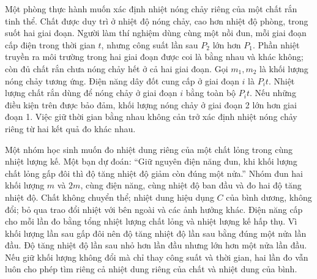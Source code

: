 
\begin{ex}
Một phòng thực hành muốn xác định nhiệt nóng chảy riêng của một chất rắn tinh thể. Chất được duy trì ở nhiệt độ nóng chảy, cao hơn nhiệt độ phòng, trong suốt hai giai đoạn. Người làm thí nghiệm dùng cùng một nồi đun, mỗi giai đoạn cấp điện trong thời gian $t$, nhưng công suất lần sau $P_2$ lớn hơn $P_1$. Phần nhiệt truyền ra môi trường trong hai giai đoạn được coi là bằng nhau và khác không; còn đủ chất rắn chưa nóng chảy hết ở cả hai giai đoạn. Gọi $m_1,m_2$ là khối lượng nóng chảy tương ứng.
\choiceTF
{\True Điện năng dây đốt cung cấp ở giai đoạn $i$ là $P_it$.}
{Nhiệt lượng chất rắn dùng để nóng chảy ở giai đoạn $i$ bằng toàn bộ $P_it$.}
{\True Nếu những điều kiện trên được bảo đảm, khối lượng nóng chảy ở giai đoạn 2 lớn hơn giai đoạn 1.}
{\True Việc giữ thời gian bằng nhau không cản trở xác định nhiệt nóng chảy riêng từ hai kết quả đo khác nhau.}
\end{ex}

\begin{ex}
Một nhóm học sinh muốn đo nhiệt dung riêng của một chất lỏng trong cùng nhiệt lượng kế. Một bạn dự đoán: ``Giữ nguyên điện năng đun, khi khối lượng chất lỏng gấp đôi thì độ tăng nhiệt độ giảm còn đúng một nửa.'' Nhóm đun hai khối lượng $m$ và $2m$, cùng điện năng, cùng nhiệt độ ban đầu và đo hai độ tăng nhiệt độ. Chất không chuyển thể; nhiệt dung hiệu dụng $C$ của bình dương, không đổi; bỏ qua trao đổi nhiệt với bên ngoài và các ảnh hưởng khác.
\choiceTF
{\True Điện năng cấp cho mỗi lần đo bằng tổng nhiệt lượng chất lỏng và nhiệt lượng kế hấp thụ.}
{Vì khối lượng lần sau gấp đôi nên độ tăng nhiệt độ lần sau bằng đúng một nửa lần đầu.}
{\True Độ tăng nhiệt độ lần sau nhỏ hơn lần đầu nhưng lớn hơn một nửa lần đầu.}
{Nếu giữ khối lượng không đổi mà chỉ thay công suất và thời gian, hai lần đo vẫn luôn cho phép tìm riêng cả nhiệt dung riêng của chất và nhiệt dung của bình.}
\end{ex}

